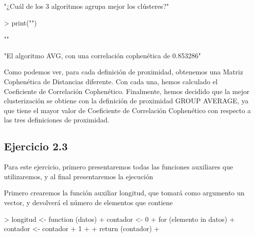 \documentclass[parskip=full]{scrartcl}
\begin{document}
\begin{Schunk}
\begin{Sinput}
\end{Sinput}
\begin{Soutput}
[1] "¿Cuál de los 3 algoritmos agrupa mejor los clústeres?"
\end{Soutput}
\begin{Sinput}
> print("")
\end{Sinput}
\begin{Soutput}
[1] ""
\end{Soutput}
\begin{Soutput}
[1] "El algoritmo AVG, con una correlación cophenética de 0.853286"
\end{Soutput}
\end{Schunk}


Como podemos ver, para cada definición de proximidad, obtenemos una Matriz Cophenética de Distancias diferente. Con cada una, hemos calculado el Coeficiente de Correlación Cophenético. Finalmente, hemos decidido que la mejor clusterización se obtiene con la definición de proximidad GROUP AVERAGE, ya que tiene el mayor valor de Coeficiente de Correlación Cophenético con respecto a las tres definiciones de proximidad.

\subsection{Ejercicio 2.3}

Para este ejercicio, primero presentaremos todas las funciones auxiliares que utilizaremos, y al final presentaremos la ejecución

Primero crearemos la función auxiliar longitud, que tomará como argumento un vector, y devolverá el número de elementos que contiene


\begin{Schunk}
\begin{Sinput}
> longitud <- function (datos){
+   contador <- 0
+   for (elemento in datos){
+     contador <- contador + 1
+   }
+   return (contador)
+ }
\end{Sinput}
\end{Schunk}
\end{document}
